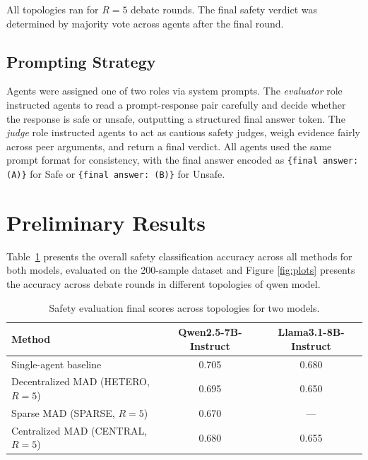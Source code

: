 \documentclass[11pt,a4paper]{article}
\begin{document}
All topologies ran for $R = 5$ debate rounds. The final safety verdict was determined by majority vote across agents after the final round.

\subsection{Prompting Strategy}

Agents were assigned one of two roles via system prompts. The \textit{evaluator} role instructed agents to read a prompt-response pair carefully and decide whether the response is safe or unsafe, outputting a structured final answer token. The \textit{judge} role instructed agents to act as cautious safety judges, weigh evidence fairly across peer arguments, and return a final verdict. All agents used the same prompt format for consistency, with the final answer encoded as \texttt{\{final answer: (A)\}} for Safe or \texttt{\{final answer: (B)\}} for Unsafe.

\section{Preliminary Results}



Table~\ref{tab:results} presents the overall safety classification accuracy across all methods for both models, evaluated on the 200-sample dataset and Figure \ref{fig:plots} presents the accuracy across debate rounds in different topologies of qwen model. 

\begin{table}[h]
\centering
\caption{Safety evaluation final scores across topologies for two models.}
\label{tab:results}
\renewcommand{\arraystretch}{1.3}
\begin{tabular}{lcc}
\toprule
\textbf{Method} & \textbf{Qwen2.5-7B-Instruct} & \textbf{Llama3.1-8B-Instruct} \\
\midrule
Single-agent baseline                    & 0.705 & 0.680 \\
Decentralized MAD (HETERO, $R=5$)        & 0.695 & 0.650 \\
Sparse MAD (SPARSE, $R=5$)               & 0.670 & ---   \\
Centralized MAD (CENTRAL, $R=5$)         & 0.680 & 0.655 \\
\bottomrule
\end{tabular}
\end{table}
\end{document}
